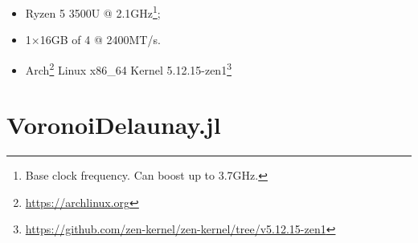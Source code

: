 \begin{itemize}
  \item {}\label{acro:AMD} Ryzen\textsuperscript{\texttrademark} 5 3500U
  \label{acro:CPU} @ 2.1GHz\footnote{Base clock frequency.  Can boost
  up to 3.7GHz.};
  \item 1×16GB \label{acro:SO-DIMM} of \label{acro:DDR}4
  \label{acro:RAM} @ 2400MT/s.
  \item Arch\footnote{\url{https://archlinux.org}}
  Linux\textsuperscript{\textregistered} x86\_64 Kernel
  5.12.15-zen1\footnote{\url{https://github.com/zen-kernel/zen-kernel/tree/v5.12.15-zen1}}
\end{itemize}
\clearpage



\section{VoronoiDelaunay.jl}%
\label{sec:eval.vdjl}



